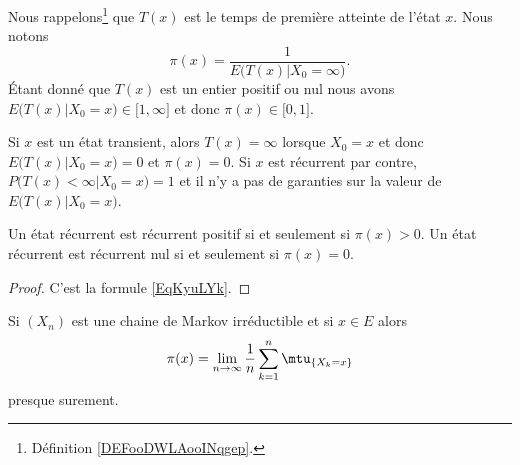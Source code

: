 Nous rappelons\footnote{Définition \ref{DEFooDWLAooINqgep}.} que \( T(x)\) est le temps de première atteinte de l'état \( x\). Nous notons
\begin{equation}        \label{EqKyuLYk}
	\pi(x)=\frac{1}{ E\big( T(x)|X_0=\infty \big) }.
\end{equation}
Étant donné que \( T(x)\) est un entier positif ou nul nous avons \( E\big( T(x)|X_0=x \big)\in\mathopen[ 1 , \infty \mathclose]\) et donc \( \pi(x)\in\mathopen[ 0 , 1 \mathclose]\).

Si \( x\) est un état transient, alors \( T(x)=\infty\) lorsque \( X_0=x\) et donc \( E\big( T(x)|X_0=x \big)=0\) et \( \pi(x)=0\). Si \( x\) est récurrent par contre, \( P\big( T(x)<\infty|X_0=x \big)=1\) et il n'y a pas de garanties sur la valeur de \( E\big( T(x)|X_0=x \big)\).

\begin{corollary}       \label{CorLhpRsk}
	Un état récurrent est récurrent positif si et seulement si \( \pi(x)>0\). Un état récurrent est récurrent nul si et seulement si \( \pi(x)=0\).
\end{corollary}

\begin{proof}
	C'est la formule \eqref{EqKyuLYk}.
\end{proof}


\begin{proposition}     \label{PropjOjDux}
	Si \( (X_n)\) est une chaine de Markov irréductible et si \( x\in E\) alors
	\begin{equation}        \label{EqPiEndempropropkeu}
		\pi(x)=\lim_{n\to \infty} \frac{1}{ n }\sum_{k=1}^n\mtu_{\{ X_k=x \}}
	\end{equation}
	presque surement.
\end{proposition}

